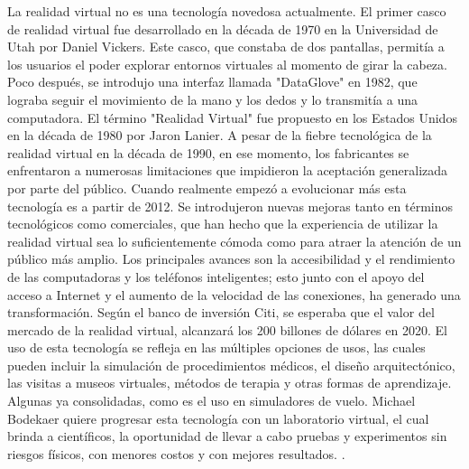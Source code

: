 La realidad virtual no es una tecnología novedosa actualmente. El primer casco de realidad virtual fue desarrollado en la década de 1970 en la Universidad de Utah por Daniel Vickers. Este casco, que constaba de dos pantallas, permitía a los usuarios el poder explorar entornos virtuales al momento de girar la cabeza. Poco después, se introdujo una interfaz llamada "DataGlove" en 1982, que lograba seguir el movimiento de la mano y los dedos y lo transmitía a una computadora. El término "Realidad Virtual" fue propuesto en los Estados Unidos en la década de 1980 por Jaron Lanier. A pesar de la fiebre tecnológica de la realidad virtual en la década de 1990, en ese momento, los fabricantes se enfrentaron a numerosas limitaciones que impidieron la aceptación generalizada por parte del público. Cuando realmente empezó a evolucionar más esta tecnología es a partir de 2012. Se introdujeron nuevas mejoras tanto en términos tecnológicos como comerciales, que han hecho que la experiencia de utilizar la realidad virtual sea lo suficientemente cómoda como para atraer la atención de un público más amplio. Los principales avances son la accesibilidad y el rendimiento de las computadoras y los teléfonos inteligentes; esto junto con el apoyo del acceso a Internet y el aumento de la velocidad de las conexiones, ha generado una transformación. Según el banco de inversión Citi, se esperaba que el valor del mercado de la realidad virtual, alcanzará los 200 billones de dólares en 2020. El uso de esta tecnología se refleja en las múltiples opciones de usos, las cuales pueden incluir la simulación de procedimientos médicos, el diseño arquitectónico, las visitas a museos virtuales, métodos de terapia y otras formas de aprendizaje. Algunas ya consolidadas, como es el uso en simuladores de vuelo. Michael Bodekaer quiere progresar esta tecnología con un laboratorio virtual, el cual brinda a científicos, la oportunidad de llevar a cabo pruebas y experimentos sin riesgos físicos, con menores costos y con mejores resultados. \cite{elmqaddem2019augmented}.
